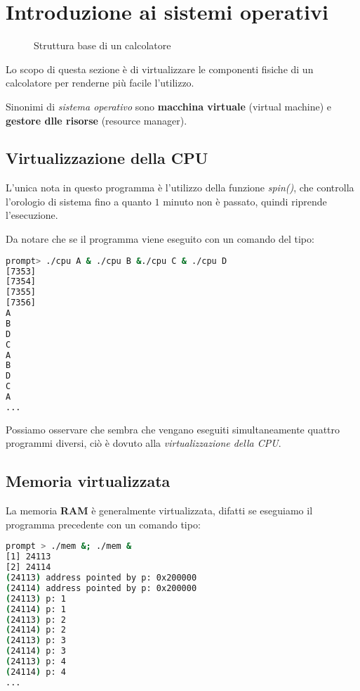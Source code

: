 \chapter{Introduzione ai sistemi operativi}
\begin{figure}[ht]
    \centering
    \caption{Struttura base di un calcolatore}
    \label{fig:struttura}
\end{figure}

Lo scopo di questa sezione è di virtualizzare le componenti fisiche di un
calcolatore per renderne più facile l'utilizzo.

Sinonimi di \emph{sistema operativo} sono \textbf{macchina virtuale} (virtual
machine) e \textbf{gestore dlle risorse} (resource manager).

\section{Virtualizzazione della CPU}
L'unica nota in questo programma è l'utilizzo della funzione \emph{spin()}, che
controlla l'orologio di sistema fino a quanto $1$ minuto non è passato, quindi
riprende l'esecuzione.



Da notare che se il programma viene eseguito con un comando del tipo:
\begin{lstlisting}[language=bash,caption=Esecuzione in concorrenza]
prompt> ./cpu A & ./cpu B &./cpu C & ./cpu D
[7353]
[7354]
[7355]
[7356]
A
B
D
C
A
B
D
C
A
...
\end{lstlisting}

Possiamo osservare che sembra che vengano eseguiti simultaneamente quattro
programmi diversi, ciò è dovuto alla \emph{virtualizzazione della CPU}.

\section{Memoria virtualizzata}


La memoria \textbf{RAM} è generalmente virtualizzata, difatti se eseguiamo
il programma precedente con un comando tipo:
\begin{lstlisting}[language=bash,caption=Esecuzione in concorrenza]
prompt > ./mem &; ./mem &
[1] 24113
[2] 24114
(24113) address pointed by p: 0x200000
(24114) address pointed by p: 0x200000
(24113) p: 1
(24114) p: 1
(24113) p: 2
(24114) p: 2
(24113) p: 3
(24114) p: 3
(24113) p: 4
(24114) p: 4
...
\end{lstlisting}


